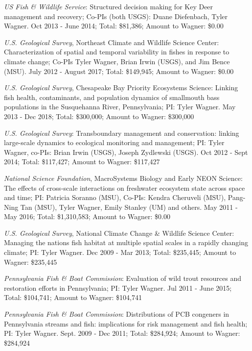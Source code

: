 \documentclass[10pt]{article}
\begin{document}
\begin{flushleft}
\begin{etaremune}
\item {\sl US Fish \& Wildlife Service}: Structured decision making for Key Deer management and recovery; Co-PIs (both USGS): Duane Diefenbach, Tyler Wagner. Oct 2013 - June 2014; Total: \$81,386; Amount to Wagner: \$0.00

\item {\sl U.S. Geological Survey}, Northeast Climate and Wildlife Science Center: Characterization of spatial and temporal variability in fishes in response to climate change; Co-PIs Tyler Wagner, Brian Irwin (USGS), and Jim Bence (MSU). July 2012 - August 2017; Total: \$149,945; Amount to Wagner: \$0.00

\item {\sl  U.S. Geological Survey},  Chesapeake Bay Priority Ecosystems Science: Linking fish health, contaminants, and population dynamics of smallmouth bass populations in the Susquehanna River, Pennsylvania; PI: Tyler Wagner. May 2013 - Dec 2018; Total: \$300,000; Amount to Wagner: \$300,000

\item {\sl  U.S. Geological Survey}: Transboundary management and conservation: linking large-scale dynamics to ecological monitoring and management; PI: Tyler Wagner, co-PIs: Brian Irwin (USGS), Joseph Zydlewski (USGS). Oct 2012 - Sept 2014; Total: \$117,427; Amount to Wagner: \$117,427

\item {\sl National Science Foundation},  MacroSystems Biology and Early NEON Science: The effects of cross-scale interactions on freshwater ecosystem state across space and time; PI: Patricia Soranno (MSU), Co-PIs: Kendra Cheruveli (MSU), Pang-Ning Tan (MSU), Tyler Wagner, Emily Stanley (UM) and others. May 2011 - May 2016; Total: \$1,310,583;  Amount to Wagner: \$0.00

\item {\sl U.S. Geological Survey}, National Climate Change \& Wildlife Science Center: Managing the nations fish habitat at multiple spatial scales in a rapidly changing climate; PI: Tyler Wagner. Dec 2009 - Mar 2013; Total: \$235,445; Amount to Wagner: \$235,445

\item {\sl  Pennsylvania Fish \& Boat Commission}: Evaluation of wild trout resources and restoration efforts in Pennsylvania; PI: Tyler Wagner. Jul 2011 - June 2015; Total: \$104,741; Amount to Wagner: \$104,741

\item  {\sl  Pennsylvania Fish \& Boat Commission}: Distributions of PCB congeners in Pennsylvania streams and fish: implications for risk management and fish health; PI: Tyler Wagner. Sept. 2009 - Dec 2011; Total: \$284,924; Amount to Wagner: \$284,924


\end{etaremune}
\end{flushleft}
\end{document}
